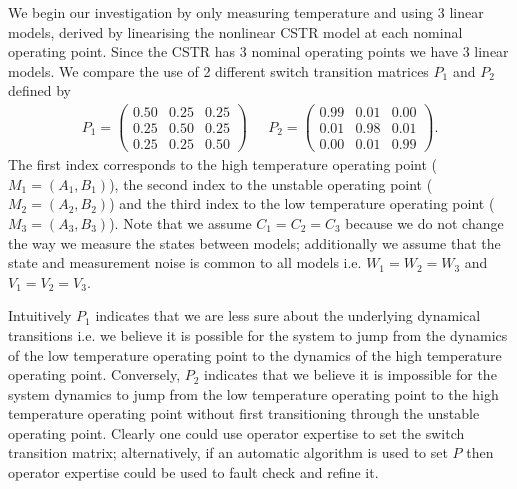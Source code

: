 We begin our investigation by only measuring temperature and using 3 linear models, derived by linearising the nonlinear CSTR model at each nominal operating point. Since the CSTR has 3 nominal operating points we have 3 linear models. We compare the use of 2 different switch transition matrices $P_1$ and $P_2$ defined by
\begin{equation}
\begin{aligned}
P_1 = \begin{pmatrix}
0.50 & 0.25 & 0.25 \\
0.25 & 0.50 & 0.25 \\
0.25 & 0.25 & 0.50
\end{pmatrix} 
~~~&P_2 = \begin{pmatrix}
0.99 & 0.01 & 0.00 \\
0.01 & 0.98 & 0.01 \\
0.00 & 0.01 & 0.99
\end{pmatrix}.
\end{aligned}
\label{eq_switch_trans}
\end{equation}
The first index corresponds to the high temperature operating point ($M_1=(A_1, B_1)$), the second index to the unstable operating point ($M_2=(A_2, B_2)$) and the third index to the low temperature operating point ($M_3=(A_3, B_3)$). Note that we assume $C_1=C_2=C_3$ because we do not change the way we measure the states between models; additionally we assume that the state and measurement noise is common to all models i.e. $W_1=W_2=W_3$ and $V_1=V_2=V_3$.

Intuitively $P_1$ indicates that we are less sure about the underlying dynamical transitions i.e. we believe it is possible for the system to jump from the dynamics of the low temperature operating point to the dynamics of the high temperature operating point. Conversely, $P_2$ indicates that we believe it is impossible for the system dynamics to jump from the low temperature operating point to the high temperature operating point without first transitioning through the unstable operating point. Clearly one could use operator expertise to set the switch transition matrix; alternatively, if an automatic algorithm is used to set $P$ then operator expertise could be used to fault check and refine it. 

